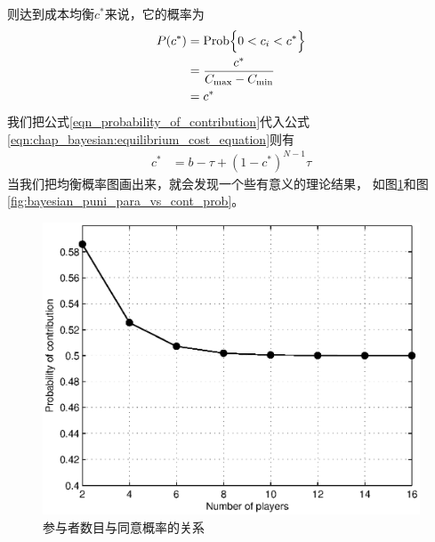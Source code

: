 则达到成本均衡$c^*$来说，它的概率为
\begin{align} 
    P(c^*) &= \text{Prob} \Bigl\{ 0 < c_i < c^*\Bigr\} \notag\\ 
    &= \frac{c^*}{C_{\max}-C_{\min}} \notag\\
    &= c^* 
    \label{eqn_probability_of_contribution} 
\end{align}
我们把公式\ref{eqn_probability_of_contribution}代入公式\ref{eqn:chap_bayesian:equilibrium_cost_equation}则有
\begin{align*} 
    c^* &= b - \tau + (1-c^*)^{N-1}\tau
\end{align*}
当我们把均衡概率图画出来，就会发现一个些有意义的理论结果，
如图\ref{fig:bayesian_user_numb_vs_contr_prob}和图\ref{fig:bayesian_puni_para_vs_cont_prob}。
\begin{figure}[tb]
\begin{centering}
\includegraphics[scale=0.7]{../figures/bayesian_user_number_vs_contribute_probability.eps}
\caption{参与者数目与同意概率的关系}
\label{fig:bayesian_user_numb_vs_contr_prob}
\end{centering}
\end{figure}
